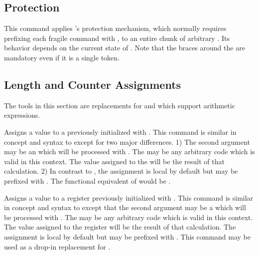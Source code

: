 \documentclass{ltxdockit}[2010/09/26]
\begin{document}
\subsection{Protection}
\label{use:pro}

\begin{ltxsyntax}


This command applies \latex's protection mechanism, which normally requires prefixing each fragile command with , to an entire chunk of arbitrary . Its behavior depends on the current state of . Note that the braces around the  are mandatory even if it is a single token.

\end{ltxsyntax}

\subsection[Lengths and Counters]{Length and Counter Assignments}
\label{use:cal}

The tools in this section are replacements for  and  which support arithmetic expressions.

\begin{ltxsyntax}


Assigns a value to a \latex {} previously initialized with . This command is similar in concept and syntax to  except for two major differences. 1) The second argument may be an  which will be processed with . The  may be any arbitrary code which is valid in this context. The value assigned to the  will be the result of that calculation. 2) In contrast to , the assignment is local by default but  may be prefixed with . The functional equivalent of  would be .


Assigns a value to a  register previously initialized with . This command is similar in concept and syntax to  except that the second argument may be a  which will be processed with . The  may be any arbitrary code which is valid in this context. The value assigned to the  register will be the result of that calculation. The assignment is local by default but  may be prefixed with . This command may be used as a drop-in replacement for .

\end{ltxsyntax}
\end{document}
